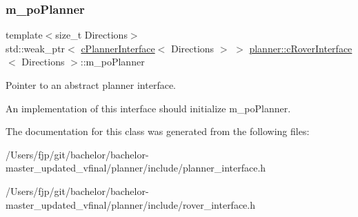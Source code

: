 \subsubsection{\texorpdfstring{m\+\_\+po\+Planner}{m\_poPlanner}}
{\footnotesize\ttfamily template$<$size\+\_\+t Directions$>$ \\
std\+::weak\+\_\+ptr$<$ \mbox{\hyperlink{classplanner_1_1c_planner_interface}{c\+Planner\+Interface}}$<$ Directions $>$ $>$ \mbox{\hyperlink{classplanner_1_1c_rover_interface}{planner\+::c\+Rover\+Interface}}$<$ Directions $>$\+::m\+\_\+po\+Planner\hspace{0.3cm}{\ttfamily [protected]}}



Pointer to an abstract planner interface. 

An implementation of this interface should initialize m\+\_\+po\+Planner. 

The documentation for this class was generated from the following files\+:\begin{DoxyCompactItemize}
\item 
/\+Users/fjp/git/bachelor/bachelor-\/master\+\_\+updated\+\_\+vfinal/planner/include/planner\+\_\+interface.\+h\item 
/\+Users/fjp/git/bachelor/bachelor-\/master\+\_\+updated\+\_\+vfinal/planner/include/rover\+\_\+interface.\+h\end{DoxyCompactItemize}
